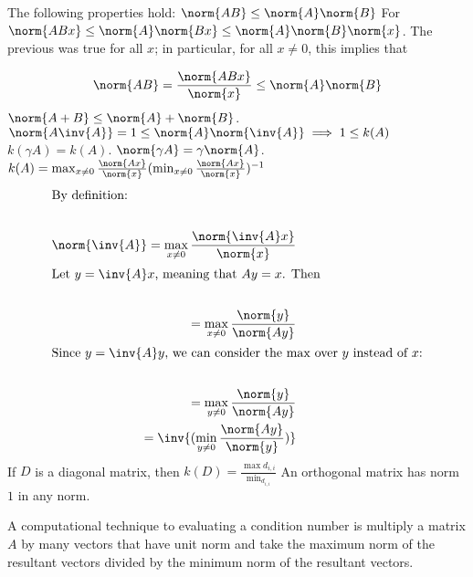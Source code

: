 \documentclass[../main.tex]{subfiles}
\begin{document}
\begin{proposition}
    \begin{outline}
        \1 The following properties hold:
        \2 $\norm{AB} \leq \norm{A} \norm{B}$
        \3 For $\norm{ABx} \leq \norm{A}\norm{Bx} \leq \norm{A} \norm{B} \norm{x}$. The previous was true for all $x$; in particular,
        for all $x \not = 0$, this implies that

        \[
            \norm{AB} = \frac{\norm{ABx}}{\norm{x}} \leq \norm{A}\norm{B}
        \]
        \2 $\norm{A + B} \leq \norm{A} + \norm{B}$.
        \2 $\norm{A \inv{A}} = 1 \leq \norm{A} \norm{\inv{A}} \implies 1 \leq k(A)$
        \1 $k(\gamma A) =  k(A)$.
        \1 $\norm{\gamma A} =  \gamma \norm{A}$.
        \1 $k(A) = \max_{x \not = 0} \frac{\norm{Ax}}{\norm{x}} (\min_{x \not = 0}\frac{\norm{Ax}}{\norm{x}})^{-1}$
        \2 
        \begin{align*}
            \intertext{By definition:} \\
            \norm{\inv{A}} = \max_{x \not = 0}\frac{\norm{\inv{A}x}}{\norm{x}} \\
            \intertext{Let $y = \inv{A}x$, meaning that $Ay = x$. Then} \\
            = \max_{x \not = 0}\frac{\norm{y}}{\norm{Ay}} \\
            \intertext{Since $y = \inv{A}y$, we can consider the $\max$ over $y$ instead of $x$:} \\
            = \max_{y \not = 0}\frac{\norm{y}}{\norm{Ay}} \\
            = \inv{(\min_{y \not = 0}\frac{\norm{Ay}}{\norm{y}})} \\
        \end{align*}
        \1 If $D$ is a diagonal matrix, then $k(D) = \frac{\max{d_{i,i}}}{\min_{d_{i,i}}}$
        \1 An orthogonal matrix has norm $1$ in any norm.
    \end{outline}
\end{proposition}

\begin{remark}
    A computational technique to evaluating a condition number is multiply a matrix $A$ by many vectors that have unit norm and take
    the maximum norm of the resultant vectors divided by the minimum norm of the resultant vectors.
\end{remark}
\end{document}
